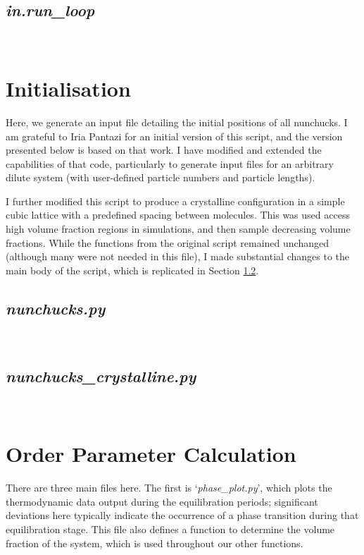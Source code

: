 \documentclass[11pt,a4paper]{article}
\begin{document}
\subsection{\textit{in.run\_loop}}
 \mbox{}\\

\section{Initialisation} \label{nunchucks.py}
Here, we generate an input file detailing the initial positions of all nunchucks. I am grateful to Iria Pantazi for an initial version of this script, and the version presented below is based on that work. I have modified and extended the capabilities of that code, particularly to generate input files for an arbitrary dilute system (with user-defined particle numbers and particle lengths).

I further modified this script to produce a crystalline configuration in a simple cubic lattice with a predefined spacing between molecules. This was used access high volume fraction regions in simulations, and then sample decreasing volume fractions. While the functions from the original script remained unchanged (although many were not needed in this file), I made substantial changes to the main body of the script, which is replicated in Section \ref{crystal_config}.

\subsection{\textit{nunchucks.py}}
 \mbox{}\\


\subsection{\textit{nunchucks\_crystalline.py}} \label{crystal_config}
 \mbox{}\\

\section{Order Parameter Calculation} \label{Order_param}
There are three main files here. The first is `\textit{phase\_plot.py}', which plots the thermodynamic data output during the equilibration periods; significant deviations here typically indicate the occurrence of a phase transition during that equilibration stage. This file also defines a function to determine the volume fraction of the system, which is used throughout our other functions.
\end{document}
